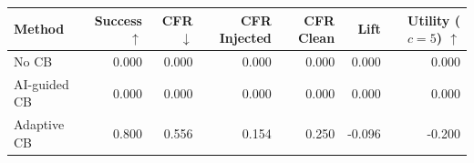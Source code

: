 \begin{tabular}{lrrrrrr}
\toprule
Method & Success $\uparrow$ & CFR $\downarrow$ & CFR Injected & CFR Clean & Lift & Utility ($c=5$) $\uparrow$ \\
\midrule
No CB & 0.000 & 0.000 & 0.000 & 0.000 & 0.000 & 0.000 \\
AI-guided CB & 0.000 & 0.000 & 0.000 & 0.000 & 0.000 & 0.000 \\
Adaptive CB & 0.800 & 0.556 & 0.154 & 0.250 & -0.096 & -0.200 \\
\bottomrule
\end{tabular}
